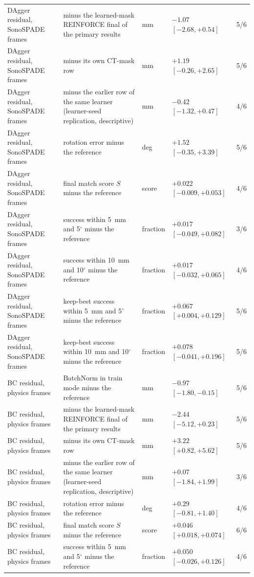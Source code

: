 \begin{table}[tp]
\begin{tabularx}{\textwidth}{@{}l >{\raggedright\arraybackslash}X l l c@{}}
DAgger residual, SonoSPADE frames & minus the learned-mask REINFORCE final of the primary results & mm & $-1.07$ $[-2.68, +0.54]$ & 5/6 \\
DAgger residual, SonoSPADE frames & minus its own CT-mask row & mm & $+1.19$ $[-0.26, +2.65]$ & 5/6 \\
DAgger residual, SonoSPADE frames & minus the earlier row of the same learner (learner-seed replication, descriptive) & mm & $-0.42$ $[-1.32, +0.47]$ & 4/6 \\
DAgger residual, SonoSPADE frames & rotation error minus the reference & deg & $+1.52$ $[-0.35, +3.39]$ & 5/6 \\
DAgger residual, SonoSPADE frames & final match score $S$ minus the reference & score & $+0.022$ $[-0.009, +0.053]$ & 4/6 \\
DAgger residual, SonoSPADE frames & success within 5~mm and 5$^\circ$ minus the reference & fraction & $+0.017$ $[-0.049, +0.082]$ & 3/6 \\
DAgger residual, SonoSPADE frames & success within 10~mm and 10$^\circ$ minus the reference & fraction & $+0.017$ $[-0.032, +0.065]$ & 4/6 \\
DAgger residual, SonoSPADE frames & keep-best success within 5~mm and 5$^\circ$ minus the reference & fraction & $+0.067$ $[+0.004, +0.129]$ & 5/6 \\
DAgger residual, SonoSPADE frames & keep-best success within 10~mm and 10$^\circ$ minus the reference & fraction & $+0.078$ $[-0.041, +0.196]$ & 5/6 \\
BC residual, physics frames & BatchNorm in train mode minus the reference & mm & $-0.97$ $[-1.80, -0.15]$ & 5/6 \\
BC residual, physics frames & minus the learned-mask REINFORCE final of the primary results & mm & $-2.44$ $[-5.12, +0.23]$ & 5/6 \\
BC residual, physics frames & minus its own CT-mask row & mm & $+3.22$ $[+0.82, +5.62]$ & 5/6 \\
BC residual, physics frames & minus the earlier row of the same learner (learner-seed replication, descriptive) & mm & $+0.07$ $[-1.84, +1.99]$ & 3/6 \\
BC residual, physics frames & rotation error minus the reference & deg & $+0.29$ $[-0.81, +1.40]$ & 4/6 \\
BC residual, physics frames & final match score $S$ minus the reference & score & $+0.046$ $[+0.018, +0.074]$ & 6/6 \\
BC residual, physics frames & success within 5~mm and 5$^\circ$ minus the reference & fraction & $+0.050$ $[-0.026, +0.126]$ & 4/6 \\

\end{tabularx}
\end{table}
